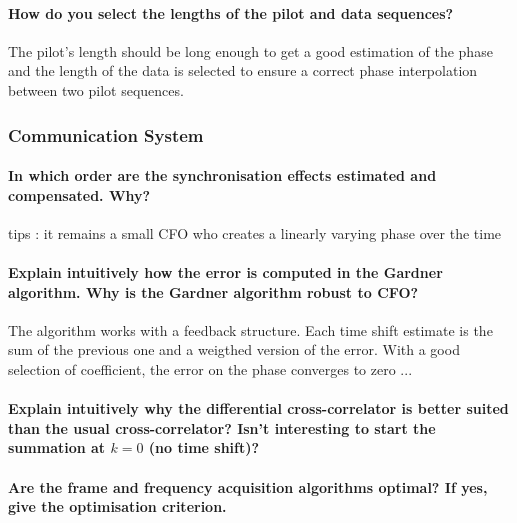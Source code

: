 \paragraph{How do you select the lengths of the pilot and data sequences?} The pilot's length should be long enough to get a good estimation of the phase and the length of the data is selected to ensure a correct phase interpolation between two pilot sequences. 

\subsubsection{Communication System}


\paragraph{In which order are the synchronisation effects estimated and compensated. Why?} tips : it remains a small CFO who creates a linearly varying  phase over the time


\paragraph{Explain intuitively how the error is computed in the Gardner algorithm. Why is the
Gardner algorithm robust to CFO?} The algorithm works with a feedback structure. Each time shift estimate is the sum of the previous one and a weigthed version of the error. With a good selection of coefficient, the error on the phase converges to zero ... 


\paragraph{Explain intuitively why the differential cross-correlator is better suited than the usual cross-correlator? Isn’t interesting to start the summation at $k = 0$ (no time shift)?}


\paragraph{Are the frame and frequency acquisition algorithms optimal? If yes, give the optimisation criterion.}


